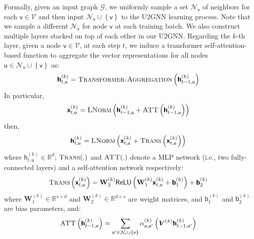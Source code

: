 \documentclass[twoside,leqno,twocolumn]{article}
\begin{document}
Formally, given an input graph $\mathcal{G}$, we uniformly sample a set $\mathcal{N}_\mathsf{v}$ of neighbors for each $\mathsf{v} \in \mathcal{V}$ and then input $\mathcal{N}_\mathsf{v}\cup\left\{\mathsf{v}\right\}$ to the U2GNN learning process. 
Note that we sample a different $\mathcal{N}_\mathsf{v}$ for node $\mathsf{v}$ at each training batch.
We also construct multiple layers stacked on top of each other in our U2GNN.
Regarding the $k$-th layer, given a node $\mathsf{v} \in \mathcal{V}$, at each step $t$, we induce a transformer self-attention-based function to aggregate the vector representations for all nodes $\mathsf{u} \in \mathcal{N}_\mathsf{v}\cup\left\{\mathsf{v}\right\}$ as:
\begin{equation}
\boldsymbol{\mathsf{h}}^{(k)}_{t,\mathsf{u}} = \textsc{Transformer-Aggregation}\left(\boldsymbol{\mathsf{h}}^{(k)}_{t-1,\mathsf{u}}\right)
\end{equation}
In particular,
\begin{equation}
\boldsymbol{\mathsf{x}}^{(k)}_{t,\mathsf{u}} = \textsc{LNorm}\left(\boldsymbol{\mathsf{h}}^{(k)}_{t-1,\mathsf{u}} + \textsc{ATT}\left(\boldsymbol{\mathsf{h}}^{(k)}_{t-1,\mathsf{u}}\right)\right)
\end{equation}
then,
\begin{equation}
\boldsymbol{\mathsf{h}}^{(k)}_{t,\mathsf{u}} = \textsc{LNorm}\left(\boldsymbol{\mathsf{x}}^{(k)}_{t,\mathsf{u}} + \textsc{Trans}\left(\boldsymbol{\mathsf{x}}^{(k)}_{t,\mathsf{u}}\right)\right) \label{equa:usa1}
\end{equation}
where $\boldsymbol{\mathsf{h}}^{(k)}_{t,\mathsf{u}} \in \mathbb{R}^d$; $\textsc{Trans}(.)$ and  $\textsc{ATT}(.)$  denote a MLP network (i.e., two fully-connected layers) and a self-attention network respectively: 
\begin{equation} 
\textsc{Trans}\left(\boldsymbol{\mathsf{x}}^{(k)}_{t,\mathsf{u}}\right) = \textbf{W}^{(k)}_2\mathsf{ReLU}\left(\textbf{W}^{(k)}_1\boldsymbol{\mathsf{x}}^{(k)}_{t,\mathsf{u}} + \boldsymbol{\mathsf{b}}^{(k)}_1\right) + \boldsymbol{\mathsf{b}}^{(k)}_2 
\label{equa:transition}
\end{equation}
where $\textbf{W}^{(k)}_1  \in \mathbb{R}^{s\times d}$ and $\textbf{W}^{(k)}_2  \in \mathbb{R}^{d\times s}$ are weight matrices, and $\boldsymbol{\mathsf{b}}^{(k)}_1$ and $\boldsymbol{\mathsf{b}}^{(k)}_2$ are bias parameters, and: 
\begin{equation} 
\textsc{ATT}\left(\boldsymbol{\mathsf{h}}^{(k)}_{t-1,\mathsf{u}}\right) = \sum_{\mathsf{u}' \in \mathcal{N}_\mathsf{v}\cup\left\{\mathsf{v}\right\}}\alpha^{(k)}_{\mathsf{u},\mathsf{u}'}\left(\boldsymbol{V}^{(k)}\boldsymbol{\mathsf{h}}^{(k)}_{t-1,\mathsf{u}'}\right) 
\label{equa:usatt1}
\end{equation}
\end{document}
